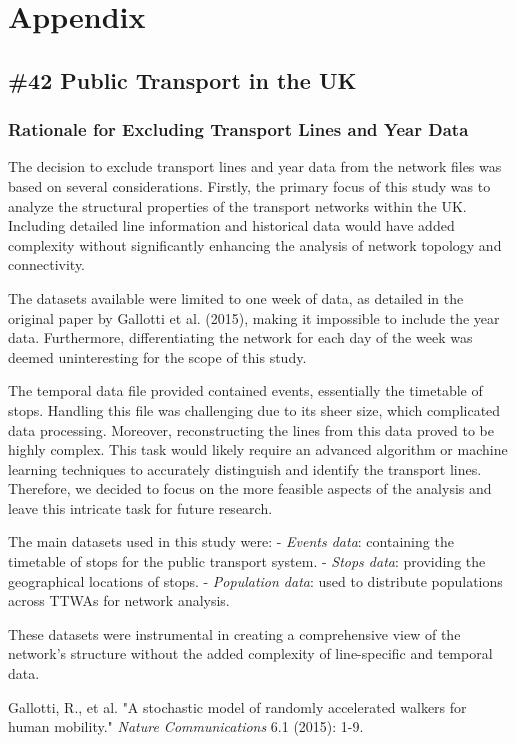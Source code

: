 \chapter{Appendix}

\section{\#42 Public Transport in the UK}


\subsection*{Rationale for Excluding Transport Lines and Year Data}
The decision to exclude transport lines and year data from the network files was based on several considerations. Firstly, the primary focus of this study was to analyze the structural properties of the transport networks within the UK. Including detailed line information and historical data would have added complexity without significantly enhancing the analysis of network topology and connectivity.

The datasets available were limited to one week of data, as detailed in the original paper by Gallotti et al. (2015)\cite{gallotti2015}, making it impossible to include the year data. Furthermore, differentiating the network for each day of the week was deemed uninteresting for the scope of this study.

The temporal data file provided contained events, essentially the timetable of stops. Handling this file was challenging due to its sheer size, which complicated data processing. Moreover, reconstructing the lines from this data proved to be highly complex. This task would likely require an advanced algorithm or machine learning techniques to accurately distinguish and identify the transport lines. Therefore, we decided to focus on the more feasible aspects of the analysis and leave this intricate task for future research.

The main datasets used in this study were:
- \textit{Events data}: containing the timetable of stops for the public transport system.
- \textit{Stops data}: providing the geographical locations of stops.
- \textit{Population data}: used to distribute populations across TTWAs for network analysis.

These datasets were instrumental in creating a comprehensive view of the network's structure without the added complexity of line-specific and temporal data.

\begin{thebibliography}{9}
 Gallotti, R., et al. "A stochastic model of randomly accelerated walkers for human mobility." \textit{Nature Communications} 6.1 (2015): 1-9.
\end{thebibliography}
